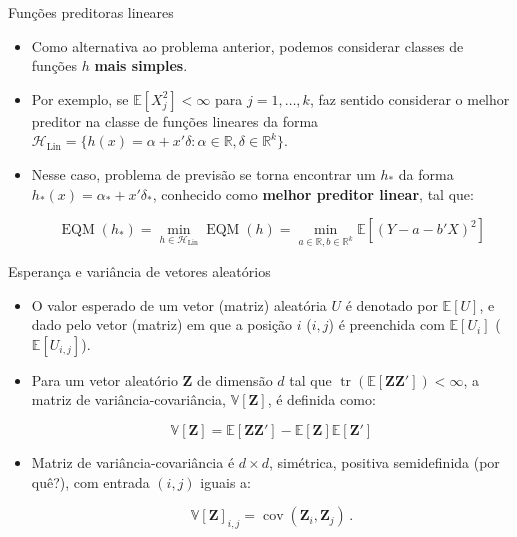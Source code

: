 \documentclass[11pt]{beamer}
\begin{document}
\begin{frame}{Funções preditoras lineares}
	\begin{itemize}
		\item Como alternativa ao problema anterior, podemos considerar classes de funções $h$ \textbf{mais simples}.
		\item Por exemplo, se $\mathbb{E}[X_j^2] < \infty$ para $j=1,\ldots, k$, faz sentido considerar o melhor preditor na classe de funções lineares da forma $\mathcal{H}_{\text{Lin}} = \{h(x) = \alpha + x'\delta: \alpha \in \mathbb{R}, \delta \in \mathbb{R}^k \}$.
		\item Nesse caso, problema de previsão se torna encontrar um $h_*$ da forma $h_*(x) = \alpha_* + x'\delta_*$, conhecido como \textbf{melhor preditor linear}, tal que:
		
		$$\operatorname{EQM}(h_*) = \min_{h \in \mathcal{H}_{\text{Lin}}} \operatorname{EQM}(h)= \min_{a \in \mathbb{R}, b \in \mathbb{R}^k}\mathbb{E}[(Y-a-b'X)^2] $$
	\end{itemize}
\end{frame}
\begin{frame}{Esperança e variância de vetores aleatórios}
\begin{itemize}
	\item O valor esperado de um vetor (matriz) aleatória $U$ é denotado por $\mathbb{E}[U]$, e dado pelo vetor (matriz) em que a posição $i$ ($i,j$) é preenchida com $\mathbb{E}[U_i]$ ($\mathbb{E}[U_{i,j}]$).
	\item Para um vetor aleatório $\boldsymbol{Z}$ de dimensão $d$ tal que $\operatorname{tr}(\mathbb{E}[\boldsymbol{Z}\boldsymbol{Z}'])<\infty$, a matriz de variância-covariância, $\mathbb{V}[\boldsymbol{Z}] $, é definida como:
	
	$$\mathbb{V}[\boldsymbol{Z}]  = \mathbb{E}[\boldsymbol{Z}\boldsymbol{Z}'] - \mathbb{E}[\boldsymbol{Z}]\mathbb{E}[\boldsymbol{Z}']$$
	
	\item Matriz de variância-covariância é $d \times d$, simétrica, positiva semidefinida (por quê?), com entrada $(i,j)$ iguais a:
	
	$$\mathbb{V}[\boldsymbol{Z}]_{i,j}= \operatorname{cov}(\boldsymbol{Z}_i,\boldsymbol{Z}_j)\, .$$
	
\end{itemize}
\end{frame}
\end{document}

